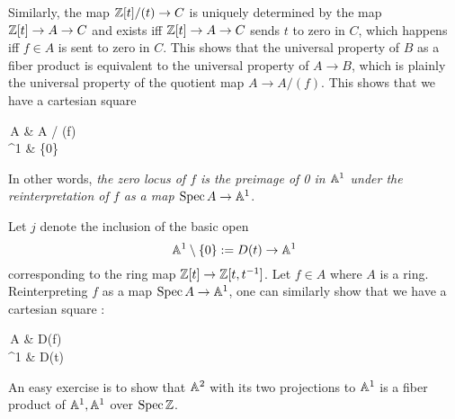 \documentclass[./main.tex]{subfiles}
\begin{document}
\begin{eg}
  Similarly, the map $\mathbb{Z}[t] / (t) \to C$ is uniquely determined by the map
  $\mathbb{Z}[t] \to A \to C$ and exists iff
  $\mathbb{Z}[t] \to A \to C$ sends $t$ to zero in $C$,
  which happens iff $f \in A$ is sent to zero in $C$.
  This shows that the universal property of $B$ as a fiber product
  is equivalent to the universal property of $A \to B$,
  which is plainly the universal property of the quotient map 
  $A \to A / (f)$.
  This shows that we have a cartesian square   
  \begin{cd}
    {\,A} & {\SPEC A / (f)} \\
    {^1} & {\{0\}}
    \arrow["f"', from=1-1, to=2-1]
    \arrow[from=1-2, to=1-1]
    \arrow[from=1-2, to=2-2]
    \arrow["i", from=2-2, to=2-1]
    \arrow["\lrcorner"{anchor=center, pos=0.125, rotate=-90}, draw=none, from=1-2, to=2-1]
  \end{cd}
  In other words, 
  \emph{the zero locus of $f$ is the preimage of
  0 in $\mathbb{A}^1$ under the reinterpretation of $f$ as a map
  $\operatorname{Spec} A \to \mathbb{A}^1$}.

\end{eg}

\begin{eg}
  
  Let $j$ denote the inclusion of the basic open \[
    \mathbb{A}^1\setminus\left\{0\right\} := D(t) \to \mathbb{A}^1 
  \]
  corresponding to the ring map $\mathbb{Z}[t] \to \mathbb{Z}[t , t^{-1}]$.
  Let $f \in A$ where $A$ is a ring.
  Reinterpreting $f$ as a map $\operatorname{Spec} A \to \mathbb{A}^1$,
  one can similarly show that we have a cartesian square :
  \begin{cd}
    {\,A} & {D(f)} \\
    {^1} & {D(t)}
    \arrow["f"', from=1-1, to=2-1]
    \arrow[from=1-2, to=1-1]
    \arrow[from=1-2, to=2-2]
    \arrow["j", from=2-2, to=2-1]
    \arrow["\lrcorner"{anchor=center, pos=0.125, rotate=-90}, draw=none, from=1-2, to=2-1]
  \end{cd}
\end{eg}

\begin{eg}
  
  An easy exercise is to show that $\mathbb{A}^2$ with its two projections
  to $\mathbb{A}^1$ is a fiber product of $\mathbb{A}^1 , \mathbb{A}^1$ over
  $\operatorname{Spec} \mathbb{Z}$.
\end{eg}
\end{document}
